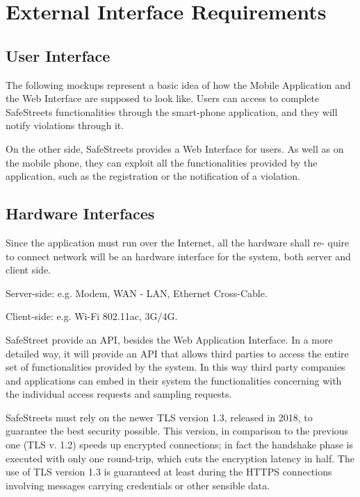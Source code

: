 \section{External Interface Requirements}

\subsection{User Interface}
The following mockups represent a basic idea of how the Mobile Application
and the Web Interface are supposed to look like.
Users can access to complete SafeStreets functionalities through the smart-phone application, and they will notify violations through it.

On the other side, SafeStreets provides a Web Interface for users. As well as on the mobile phone, 
they can exploit all the functionalities provided by the application, such as the registration or the notification of a violation.

\subsection{Hardware Interfaces}
Since the application must run over the Internet, all the hardware shall re-
quire to connect network will be an hardware interface for the system, both
server and client side.
\item Server-side: e.g. Modem, WAN - LAN, Ethernet Cross-Cable.
\item Client-side: e.g. Wi-Fi 802.11ac, 3G/4G. 

SafeStreet provide an API, besides the Web Application Interface.
In a more detailed way, it will provide an API that allows third parties to access
the entire set of functionalities provided by the system. In this way 
third party companies and applications can embed in their system the
functionalities concerning with the individual access requests and sampling
requests.

SafeStreets must rely on the newer TLS version 1.3, released in 2018, to guarantee the best
security possible. This version, in comparison to the previous one (TLS v. 1.2) speeds up encrypted connections;
in fact the handshake phase is executed with only one round-trip, which cuts the encryption latency in half.
The use of TLS version 1.3 is guaranteed at least during the HTTPS connections involving messages
carrying credentials or other sensible data.
